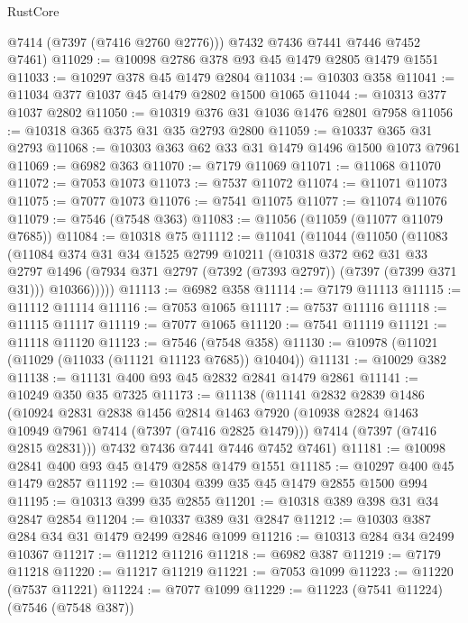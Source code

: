 \begin{lexlean}{RustCore}
\begin{coremodule}
        @7414
        (@7397 (@7416 @2760 @2776)))
      @7432
      @7436
      @7441
      @7446
      @7452
      @7461)
@11029 := @10098 @2786 @378 @93 @45 @1479 @2805 @1479 @1551
@11033 := @10297 @378 @45 @1479 @2804
@11034 := @10303 @358
@11041 := @11034 @377 @1037 @45 @1479 @2802 @1500 @1065
@11044 := @10313 @377 @1037 @2802
@11050 := @10319 @376 @31 @1036 @1476 @2801 @7958
@11056 := @10318 @365 @375 @31 @35 @2793 @2800
@11059 := @10337 @365 @31 @2793
@11068 := @10303 @363 @62 @33 @31 @1479 @1496 @1500 @1073 @7961
@11069 := @6982 @363
@11070 := @7179 @11069
@11071 := @11068 @11070
@11072 := @7053 @1073
@11073 := @7537 @11072
@11074 := @11071 @11073
@11075 := @7077 @1073
@11076 := @7541 @11075
@11077 := @11074 @11076
@11079 := @7546 (@7548 @363)
@11083 := @11056 (@11059 (@11077 @11079 @7685))
@11084 := @10318 @75
@11112 := @11041
    (@11044
      (@11050
        (@11083
          (@11084
            @374
            @31
            @34
            @1525
            @2799
            @10211
            (@10318
              @372
              @62
              @31
              @33
              @2797
              @1496
              (@7934 @371 @2797 (@7392 (@7393 @2797)) (@7397 (@7399 @371 @31)))
              @10366)))))
@11113 := @6982 @358
@11114 := @7179 @11113
@11115 := @11112 @11114
@11116 := @7053 @1065
@11117 := @7537 @11116
@11118 := @11115 @11117
@11119 := @7077 @1065
@11120 := @7541 @11119
@11121 := @11118 @11120
@11123 := @7546 (@7548 @358)
@11130 := @10978 (@11021 (@11029 (@11033 (@11121 @11123 @7685)) @10404))
@11131 := @10029 @382
@11138 := @11131 @400 @93 @45 @2832 @2841 @1479 @2861
@11141 := @10249 @350 @35 @7325
@11173 := @11138
    (@11141
      @2832
      @2839
      @1486
      (@10924
        @2831
        @2838
        @1456
        @2814
        @1463
        @7920
        (@10938 @2824 @1463 @10949 @7961 @7414 (@7397 (@7416 @2825 @1479)))
        @7414
        (@7397 (@7416 @2815 @2831)))
      @7432
      @7436
      @7441
      @7446
      @7452
      @7461)
@11181 := @10098 @2841 @400 @93 @45 @1479 @2858 @1479 @1551
@11185 := @10297 @400 @45 @1479 @2857
@11192 := @10304 @399 @35 @45 @1479 @2855 @1500 @994
@11195 := @10313 @399 @35 @2855
@11201 := @10318 @389 @398 @31 @34 @2847 @2854
@11204 := @10337 @389 @31 @2847
@11212 := @10303 @387 @284 @34 @31 @1479 @2499 @2846 @1099
@11216 := @10313 @284 @34 @2499 @10367
@11217 := @11212 @11216
@11218 := @6982 @387
@11219 := @7179 @11218
@11220 := @11217 @11219
@11221 := @7053 @1099
@11223 := @11220 (@7537 @11221)
@11224 := @7077 @1099
@11229 := @11223 (@7541 @11224) (@7546 (@7548 @387))

\end{coremodule}
\end{lexlean}
